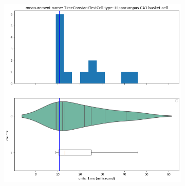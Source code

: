 \begin{figure}
\begin{center}
\begin{subfigure}{scale=0.5}
  \centering
      \includegraphics[scale=0.45]{notebooks_converted/needata_thesis_files/needata_thesis_5_7}
  \label{fig:sub2}
\end{subfigure}

\label{fig:test}
\end{center}
\end{figure}

    
    
